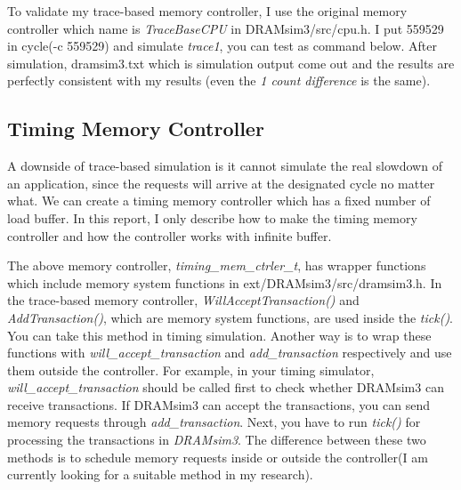 \documentclass[conference]{IEEEtran}
\begin{document}


To validate my trace-based memory controller, I use the original memory controller which name is \emph{TraceBaseCPU} in DRAMsim3/src/cpu.h. 
I put 559529 in cycle(-c 559529) and simulate \emph{trace1}, you can test as command below. 
After simulation, dramsim3.txt which is simulation output come out and the results are perfectly consistent with my results (even the \emph{1 count difference} is the same).   



\subsection{Timing Memory Controller}
A downside of trace-based simulation is it cannot simulate the real slowdown of an application, since the requests will arrive at the designated cycle no matter what. 
We can create a timing memory controller which has a fixed number of load buffer.
In this report, I only describe how to make the timing memory controller and how the controller works with infinite buffer. 




The above memory controller, \emph{timing\_mem\_ctrler\_t}, has wrapper functions which include memory system functions in ext/DRAMsim3/src/dramsim3.h.
In the trace-based memory controller, \emph{WillAcceptTransaction()} and \emph{AddTransaction()}, which are memory system functions, are used inside the \emph{tick()}.
You can take this method in timing simulation.
Another way is to wrap these functions with \emph{will\_accept\_transaction} and \emph{add\_transaction} respectively and use them outside the controller.
For example, in your timing simulator, \emph{will\_accept\_transaction} should be called first to check whether DRAMsim3 can receive transactions.
If DRAMsim3 can accept the transactions, you can send memory requests through \emph{add\_transaction}.   
Next, you have to run \emph{tick()} for processing the transactions in \emph{DRAMsim3}.
The difference between these two methods is to schedule memory requests inside or outside the controller(I am currently looking for a suitable method in my research).
\end{document}
